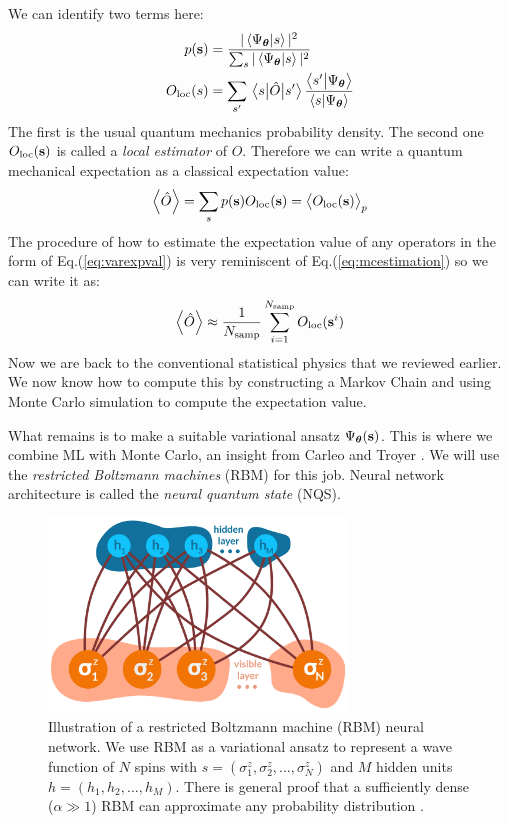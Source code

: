 We can identify two terms here:
\begin{align}
	p(\vb{s}) &= \frac{|\braket{\Psi_{\boldsymbol{\theta}}}{s}|^2}{\sum_s |\braket{\Psi_{\boldsymbol{\theta}}}{s}|^2} \\
	O_{\text{loc}}(s) &= \sum_{s'} \mel{s}{\hat{O}}{s'}\frac{\braket{s'}{\Psi_{\boldsymbol{\theta}}}}{\braket{s}{\Psi_{\boldsymbol{\theta}}}}
\end{align}
The first is the usual quantum mechanics probability density. The second one $O_{\text{loc}}(\vb{s})$ is called a \textit{local estimator} of $\hat{O}$. Therefore we can write a quantum mechanical expectation as a classical expectation value:
\begin{equation}
	\expval{\hat{O}} = \sum_s p(\vb{s}) O_{\text{loc}}(\vb{s}) = \expval{O_{\text{loc}}(\vb{s})}_p
	\label{eq:varexpval}
\end{equation}
The procedure of how to estimate the expectation value of any operators in the form of Eq.(\ref{eq:varexpval}) is very reminiscent of Eq.(\ref{eq:mcestimation}) so we can write it as:
\begin{equation}
	\expval{\hat{O}} \approx \frac{1}{N_{\text{samp}}} \sum_{i=1}^{N_{\text{samp}}} O_{\text{loc}}(\vb{s}^i)
	\label{eq:explocalop}
\end{equation}
Now we are back to the conventional statistical physics that we reviewed earlier. We now know how to compute this by constructing a Markov Chain and using Monte Carlo simulation to compute the expectation value.
\par
What remains is to make a suitable variational ansatz $\Psi_{\boldsymbol{\theta}}(\vb{s})$. This is where we combine ML with Monte Carlo, an insight from Carleo and Troyer \cite{carleoTroyer}. We will use the \textit{restricted Boltzmann machines} (RBM) for this job. Neural network architecture is called the \textit{neural quantum state} (NQS). 
\begin{figure}[H]
	\centering
	\includegraphics[width=8cm]{figures/introduction/rbm.pdf}
	\caption{Illustration of a restricted Boltzmann machine (RBM) neural network. We use RBM as a variational ansatz to represent a wave function of $N$ spins with $s = (\sigma_1^z, \sigma_2^z, \dots, \sigma_N^z)$ and $M$ hidden units $h = (h_1, h_2, \dots, h_M)$. There is general proof that a sufficiently dense ($\alpha \gg 1$) RBM can approximate any probability distribution \cite{HORNIK1989359}.}
	\label{gr:rbmArchitecture}
\end{figure}
